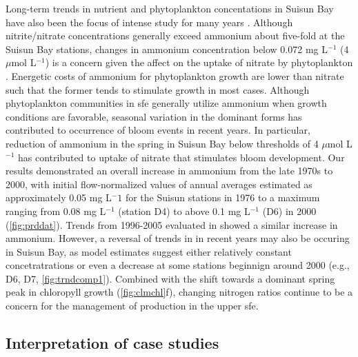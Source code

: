 \documentclass[letterpaper,12pt,oneside]{article}\usepackage[]{graphicx}\usepackage[]{color}
\begin{document}
Long-term trends in nutrient and phytoplankton concentations in Suisun Bay have also been the focus of intense study for many years \citep{Cloern83,Lehman92,Dugdale07,Jassby08,Glibert14}.  Although nitrite/nitrate concentrations generally exceed ammonium about five-fold at the Suisun Bay stations, changes in ammonium concentration below 0.072 mg L$^{-1}$ (4 $\mu$mol L$^{-1}$) is a concern given the affect on the uptake of nitrate by phytoplankton \citep{Dugdale07}.  Energetic costs of ammonium for phytoplankton growth are lower than nitrate such that the former tends to stimulate growth in most cases.  Although phytoplankton communities in \ac{sfe} generally utilize ammonium when growth conditions are favorable, seasonal variation in the dominant forms has contributed to occurrence of bloom events in recent years.  In particular, reduction of ammonium in the spring in Suisun Bay below thresholds of  4 $\mu$mol L$^{-1}$ has contributed to uptake of nitrate that stimulates bloom development. Our results demonstrated an overall increase in ammonium from the late 1970s to 2000, with initial flow-normalized values of annual averages estimated as approximately 0.05 mg L$^-1$ for the Suisun stations in 1976 to a maximum ranging from 0.08 mg L$^{-1}$ (station D4) to above 0.1 mg L$^{-1}$ (D6) in 2000 (\cref{fig:prddat}).  Trends from 1996-2005 evaluated in \citep{Jassby08} showed a similar increase in ammonium.  However, a reversal of trends in in recent years may also be occuring in Suisun Bay, as model estimates suggest either relatively constant concetratrations or even a decrease at some stations beginnign around 2000 (e.g., D6, D7, \cref{fig:trndcomp1}).  Combined with the shift towards a dominant spring peak in chloropyll growth (\cref{fig:clmchl}f), changing nitrogen ratios continue to be a concern for the management of production in the upper \ac{sfe}. 

\subsection{Interpretation of case studies}
\end{document}
